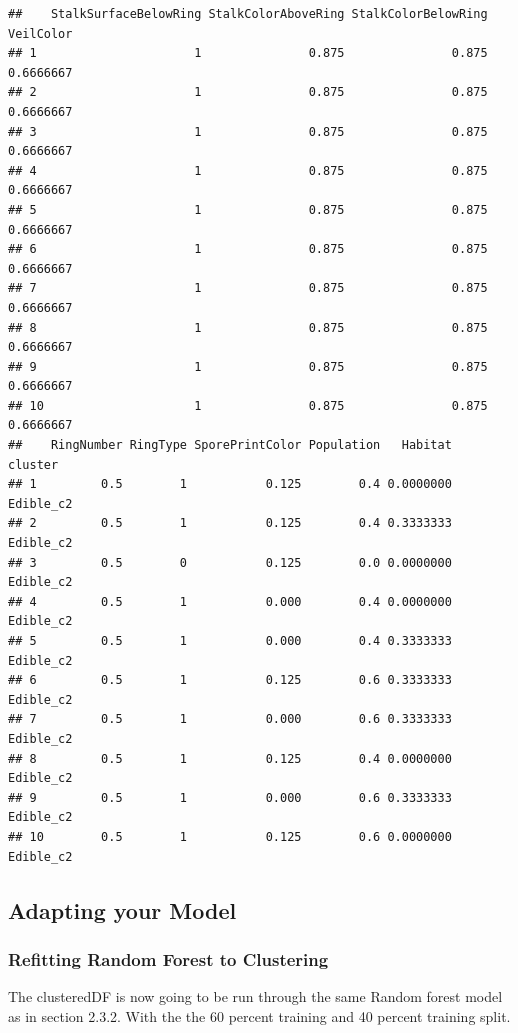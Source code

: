 \documentclass[10pt  ,usenames, dvipsnames]{article}\usepackage[]{graphicx}\usepackage[]{color}
\makeatletter
\newenvironment{kframe}{%
 \def\at@end@of@kframe{}%
 \ifinner\ifhmode%
  \def\at@end@of@kframe{\end{minipage}}%
  \begin{minipage}{\columnwidth}%
 \fi\fi%
 \def\FrameCommand##1{\hskip\@totalleftmargin \hskip-\fboxsep
 \colorbox{shadecolor}{##1}\hskip-\fboxsep
     \hskip-\linewidth \hskip-\@totalleftmargin \hskip\columnwidth}%
 \MakeFramed {\advance\hsize-\width
   \@totalleftmargin\z@ \linewidth\hsize
   \@setminipage}}%
 {\par\unskip\endMakeFramed%
 \at@end@of@kframe}
\newenvironment{knitrout}{}{} %
\makeatother
\begin{document}
\begin{knitrout}
\begin{kframe}
\begin{verbatim}
##    StalkSurfaceBelowRing StalkColorAboveRing StalkColorBelowRing VeilColor
## 1                      1               0.875               0.875 0.6666667
## 2                      1               0.875               0.875 0.6666667
## 3                      1               0.875               0.875 0.6666667
## 4                      1               0.875               0.875 0.6666667
## 5                      1               0.875               0.875 0.6666667
## 6                      1               0.875               0.875 0.6666667
## 7                      1               0.875               0.875 0.6666667
## 8                      1               0.875               0.875 0.6666667
## 9                      1               0.875               0.875 0.6666667
## 10                     1               0.875               0.875 0.6666667
##    RingNumber RingType SporePrintColor Population   Habitat   cluster
## 1         0.5        1           0.125        0.4 0.0000000 Edible_c2
## 2         0.5        1           0.125        0.4 0.3333333 Edible_c2
## 3         0.5        0           0.125        0.0 0.0000000 Edible_c2
## 4         0.5        1           0.000        0.4 0.0000000 Edible_c2
## 5         0.5        1           0.000        0.4 0.3333333 Edible_c2
## 6         0.5        1           0.125        0.6 0.3333333 Edible_c2
## 7         0.5        1           0.000        0.6 0.3333333 Edible_c2
## 8         0.5        1           0.125        0.4 0.0000000 Edible_c2
## 9         0.5        1           0.000        0.6 0.3333333 Edible_c2
## 10        0.5        1           0.125        0.6 0.0000000 Edible_c2
\end{verbatim}
\end{kframe}
\end{knitrout}

\clearpage
\subsection{Adapting your Model}


\subsubsection{Refitting Random Forest to Clustering}

The clusteredDF is now going to be run through the same Random forest model as in section 2.3.2. 
With the the 60 percent training and 40 percent training split. 
\end{document}
